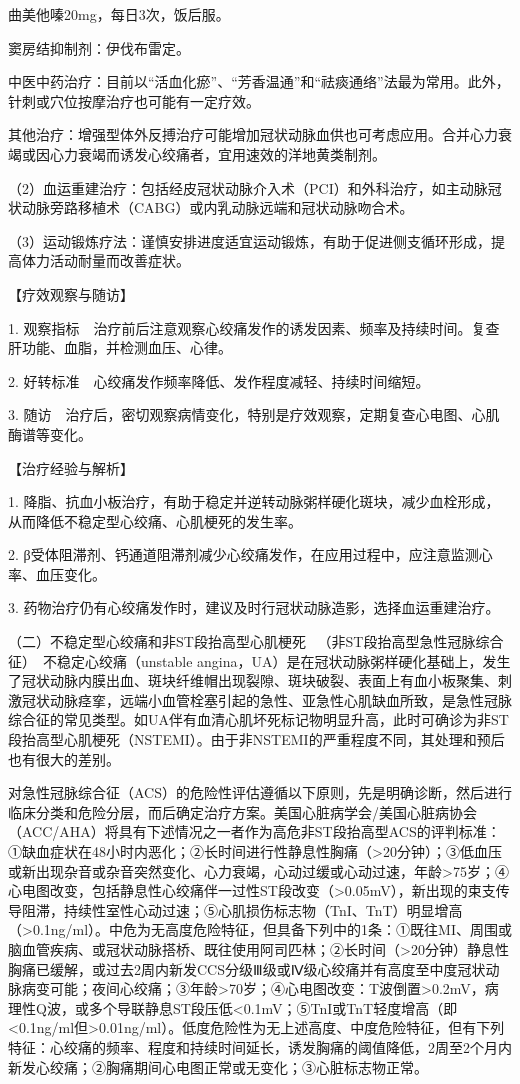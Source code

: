 曲美他嗪20mg，每日3次，饭后服。

窦房结抑制剂：伊伐布雷定。

中医中药治疗：目前以“活血化瘀”、“芳香温通”和“祛痰通络”法最为常用。此外，针刺或穴位按摩治疗也可能有一定疗效。

其他治疗：增强型体外反搏治疗可能增加冠状动脉血供也可考虑应用。合并心力衰竭或因心力衰竭而诱发心绞痛者，宜用速效的洋地黄类制剂。

（2）血运重建治疗：包括经皮冠状动脉介入术（PCI）和外科治疗，如主动脉冠状动脉旁路移植术（CABG）或内乳动脉远端和冠状动脉吻合术。

（3）运动锻炼疗法：谨慎安排进度适宜运动锻炼，有助于促进侧支循环形成，提高体力活动耐量而改善症状。

【疗效观察与随访】

1.
观察指标　治疗前后注意观察心绞痛发作的诱发因素、频率及持续时间。复查肝功能、血脂，并检测血压、心律。

2. 好转标准　心绞痛发作频率降低、发作程度减轻、持续时间缩短。

3.
随访　治疗后，密切观察病情变化，特别是疗效观察，定期复查心电图、心肌酶谱等变化。

【治疗经验与解析】

1.
降脂、抗血小板治疗，有助于稳定并逆转动脉粥样硬化斑块，减少血栓形成，从而降低不稳定型心绞痛、心肌梗死的发生率。

2.
β受体阻滞剂、钙通道阻滞剂减少心绞痛发作，在应用过程中，应注意监测心率、血压变化。

3. 药物治疗仍有心绞痛发作时，建议及时行冠状动脉造影，选择血运重建治疗。

{（二）不稳定型心绞痛和非ST段抬高型心肌梗死}
　（非ST段抬高型急性冠脉综合征）　不稳定心绞痛（unstable
angina，UA）是在冠状动脉粥样硬化基础上，发生了冠状动脉内膜出血、斑块纤维帽出现裂隙、斑块破裂、表面上有血小板聚集、刺激冠状动脉痉挛，远端小血管栓塞引起的急性、亚急性心肌缺血所致，是急性冠脉综合征的常见类型。如UA伴有血清心肌坏死标记物明显升高，此时可确诊为非ST段抬高型心肌梗死（NSTEMI）。由于非NSTEMI的严重程度不同，其处理和预后也有很大的差别。

对急性冠脉综合征（ACS）的危险性评估遵循以下原则，先是明确诊断，然后进行临床分类和危险分层，而后确定治疗方案。美国心脏病学会/美国心脏病协会（ACC/AHA）将具有下述情况之一者作为高危非ST段抬高型ACS的评判标准：①缺血症状在48小时内恶化；②长时间进行性静息性胸痛（\textgreater{}20分钟）；③低血压或新出现杂音或杂音突然变化、心力衰竭，心动过缓或心动过速，年龄\textgreater{}75岁；④心电图改变，包括静息性心绞痛伴一过性ST段改变（\textgreater{}0.05mV），新出现的束支传导阻滞，持续性室性心动过速；⑤心肌损伤标志物（TnI、TnT）明显增高（\textgreater{}0.1ng/ml）。中危为无高度危险特征，但具备下列中的1条：①既往MI、周围或脑血管疾病、或冠状动脉搭桥、既往使用阿司匹林；②长时间（\textgreater{}20分钟）静息性胸痛已缓解，或过去2周内新发CCS分级Ⅲ级或Ⅳ级心绞痛并有高度至中度冠状动脉病变可能；夜间心绞痛；③年龄\textgreater{}70岁；④心电图改变：T波倒置\textgreater{}0.2mV，病理性Q波，或多个导联静息ST段压低\textless{}0.1mV；⑤TnI或TnT轻度增高（即\textless{}0.1ng/ml但\textgreater{}0.01ng/ml）。低度危险性为无上述高度、中度危险特征，但有下列特征：心绞痛的频率、程度和持续时间延长，诱发胸痛的阈值降低，2周至2个月内新发心绞痛；②胸痛期间心电图正常或无变化；③心脏标志物正常。

